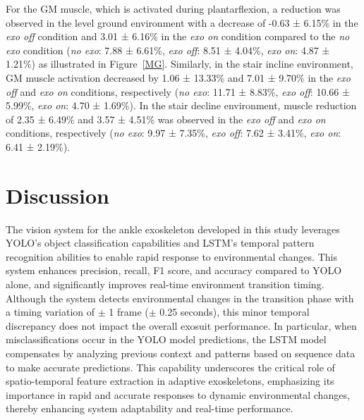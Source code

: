 \documentclass[journal,article,submit,pdftex,moreauthors]{Definitions/mdpi}
\begin{document}
For the GM muscle, which is activated during plantarflexion, a reduction was observed in the level ground environment with a decrease of -0.63 ± 6.15\% in the \textit{exo off} condition and 3.01 ± 6.16\% in the \textit{exo on} condition compared to the \textit{no exo} condition (\textit{no exo}: 7.88 ± 6.61\%, \textit{exo off}: 8.51 ± 4.04\%, \textit{exo on}: 4.87 ± 1.21\%) as illustrated in Figure~\ref{MG}. Similarly, in the stair incline environment, GM muscle activation decreased by 1.06 ± 13.33\% and 7.01 ± 9.70\% in the \textit{exo off} and \textit{exo on} conditions, respectively (\textit{no exo}: 11.71 ± 8.83\%, \textit{exo off}: 10.66 ± 5.99\%, \textit{exo on}: 4.70 ± 1.69\%). In the stair decline environment, muscle reduction of 2.35 ± 6.49\% and 3.57 ± 4.51\% was observed in the \textit{exo off} and \textit{exo on} conditions, respectively (\textit{no exo}: 9.97 ± 7.35\%, \textit{exo off}: 7.62 ± 3.41\%, \textit{exo on}: 6.41 ± 2.19\%).



\section{Discussion}

The vision system for the ankle exoskeleton developed in this study leverages YOLO's object classification capabilities and LSTM's temporal pattern recognition abilities to enable rapid response to environmental changes. This system enhances precision, recall, F1 score, and accuracy compared to YOLO alone, and significantly improves real-time environment transition timing. Although the system detects environmental changes in the transition phase with a timing variation of $\pm$ 1 frame ($\pm$ 0.25 seconds), this minor temporal discrepancy does not impact the overall exosuit performance. 
In particular, when misclassifications occur in the YOLO model predictions, the LSTM model compensates by analyzing previous context and patterns based on sequence data to make accurate predictions. This capability underscores the critical role of spatio-temporal feature extraction in adaptive exoskeletons, emphasizing its importance in rapid and accurate responses to dynamic environmental changes, thereby enhancing system adaptability and real-time performance.
\end{document}
